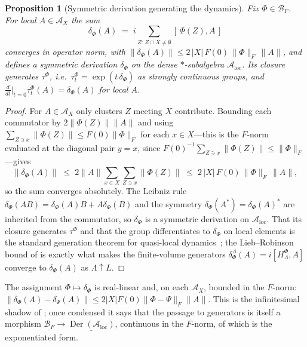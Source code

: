 \documentclass[12pt]{article}
\newcommand{\cond}[1]{\underline{#1}}          %
\newcommand{\Ffun}{F}                          %
\newcommand{\BF}{\mathcal{B}_{F}}              %
\newcommand{\qA}{\mathcal{A}}
\newcommand{\Der}{\operatorname{Der}}
\newcommand{\norm}[1]{\lVert #1\rVert}
\newcommand{\Fnorm}[1]{\lVert #1\rVert_{F}}
\newcommand{\loc}{\mathrm{loc}}
\newtheorem{proposition}[theorem]{Proposition}
\theoremstyle{definition}
\theoremstyle{remark}
\begin{document}
\begin{proposition}[Symmetric derivation generating the dynamics]
\label{prop:generator}
Fix $\Phi\in\BF$. For local $A\in\qA_X$ the sum
\[
  \delta_\Phi(A)\;=\;i\sum_{Z:\,Z\cap X\ne\emptyset}[\,\Phi(Z),A\,]
\]
converges in operator norm, with
$\norm{\delta_\Phi(A)}\le 2\,\lvert X\rvert\,\Ffun(0)\,\Fnorm{\Phi}\,\norm{A}$, and defines a
symmetric derivation $\delta_\Phi$ on the dense $*$-subalgebra $\qA_\loc$. Its closure
generates $\tau^\Phi$, i.e.\ $\tau^\Phi_t=\exp(t\,\overline{\delta_\Phi})$ as strongly
continuous groups, and $\tfrac{d}{dt}\big|_{t=0}\tau^\Phi_t(A)=\delta_\Phi(A)$ for local $A$.
\end{proposition}
\begin{proof}
For $A\in\qA_X$ only clusters $Z$ meeting $X$ contribute. Bounding each commutator by
$2\norm{\Phi(Z)}\norm{A}$ and using $\sum_{Z\ni x}\norm{\Phi(Z)}\le\Ffun(0)\Fnorm{\Phi}$ for
each $x\in X$---this is the $\Ffun$-norm evaluated at the diagonal pair $y=x$, since
$\Ffun(0)^{-1}\sum_{Z\ni x}\norm{\Phi(Z)}\le\Fnorm{\Phi}$---gives
\[
  \norm{\delta_\Phi(A)}\;\le\;2\norm{A}\sum_{x\in X}\sum_{Z\ni x}\norm{\Phi(Z)}
  \;\le\;2\,\lvert X\rvert\,\Ffun(0)\,\Fnorm{\Phi}\,\norm{A} ,
\]
so the sum converges absolutely. The Leibniz rule $\delta_\Phi(AB)=\delta_\Phi(A)B+A\delta_\Phi
(B)$ and the symmetry $\delta_\Phi(A^*)=\delta_\Phi(A)^*$ are inherited from the commutator, so
$\delta_\Phi$ is a symmetric derivation on $\qA_\loc$. That its closure generates $\tau^\Phi$
and that the group differentiates to $\delta_\Phi$ on local elements is the standard generation
theorem for quasi-local dynamics~\cite{nsy-quasilocality-1, hastings-locality}; the
Lieb--Robinson bound of  is exactly what makes the finite-volume generators
$\delta^\Lambda_\Phi(A)=i[H^\Phi_\Lambda,A]$ converge to $\delta_\Phi(A)$ as $\Lambda\uparrow L$.
\end{proof}

The assignment $\Phi\mapsto\delta_\Phi$ is real-linear and, on each $\qA_X$, bounded in the
$\Ffun$-norm: $\norm{\delta_\Phi(A)-\delta_\Psi(A)}\le 2\lvert X\rvert\Ffun(0)\Fnorm{\Phi-\Psi}
\norm{A}$. This is the infinitesimal shadow of ; once condensed it
says that the passage to generators is itself a morphism $\cond{\BF}\to\cond{\Der(\qA_\loc)}$,
continuous in the $\Ffun$-norm, of which  is the exponentiated
form.
\end{document}
